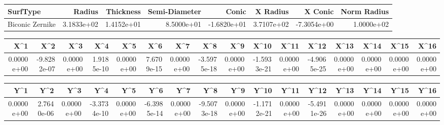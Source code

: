 \documentclass[varwidth=\maxdimen, convert={convertexe={magick.exe}}]{standalone}
\begin{document}
\begin{tabular}{lrrrrrrr}
\toprule
       SurfType &     Radius &  Thickness &  Semi-Diameter &       Conic &   X Radius &     X Conic &  Norm Radius \\
\midrule
Biconic Zernike & 3.1833e+02 & 1.4152e+01 &     8.5000e+01 & -1.6820e+01 & 3.7107e+02 & -7.3054e+00 &   1.0000e+02 \\
\bottomrule
\end{tabular}

\begin{tabular}{rrrrrrrrrrrrrrrr}
\toprule
       X\textasciicircum 1 &         X\textasciicircum 2 &        X\textasciicircum 3 &        X\textasciicircum 4 &        X\textasciicircum 5 &        X\textasciicircum 6 &        X\textasciicircum 7 &         X\textasciicircum 8 &        X\textasciicircum 9 &        X\textasciicircum 10 &       X\textasciicircum 11 &        X\textasciicircum 12 &       X\textasciicircum 13 &       X\textasciicircum 14 &       X\textasciicircum 15 &       X\textasciicircum 16 \\
\midrule
0.0000e+00 & -9.8282e-07 & 0.0000e+00 & 1.9185e-10 & 0.0000e+00 & 7.6709e-15 & 0.0000e+00 & -3.5975e-18 & 0.0000e+00 & -1.5933e-21 & 0.0000e+00 & -4.9065e-25 & 0.0000e+00 & 0.0000e+00 & 0.0000e+00 & 0.0000e+00 \\
\bottomrule
\end{tabular}

\begin{tabular}{rrrrrrrrrrrrrrrr}
\toprule
       Y\textasciicircum 1 &        Y\textasciicircum 2 &        Y\textasciicircum 3 &         Y\textasciicircum 4 &        Y\textasciicircum 5 &         Y\textasciicircum 6 &        Y\textasciicircum 7 &         Y\textasciicircum 8 &        Y\textasciicircum 9 &        Y\textasciicircum 10 &       Y\textasciicircum 11 &        Y\textasciicircum 12 &       Y\textasciicircum 13 &       Y\textasciicircum 14 &       Y\textasciicircum 15 &       Y\textasciicircum 16 \\
\midrule
0.0000e+00 & 2.7640e-06 & 0.0000e+00 & -3.3734e-10 & 0.0000e+00 & -6.3985e-14 & 0.0000e+00 & -9.5073e-18 & 0.0000e+00 & -1.1712e-21 & 0.0000e+00 & -5.4911e-26 & 0.0000e+00 & 0.0000e+00 & 0.0000e+00 & 0.0000e+00 \\
\bottomrule
\end{tabular}
\end{document}
